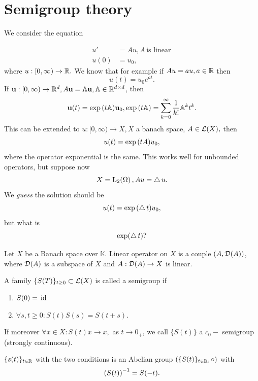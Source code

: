 \documentclass{article}
\begin{document}
\section{Semigroup theory}
\label{sec:semigroups}
We consider the equation

\begin{align*}
	u' &= Au, A \, \text{is linear} \,\\
	u(0) &= u_0,
\end{align*}
where $u:[0, \infty) \to {\mathbb R}.$ We know that for example if $Au = au, a \in {\mathbb R}$ then
\[
	u(t) = u_0 e^{at}.
\]
If $\vb{u}: [0,\infty) \to {\mathbb R}^{d}, A\vb{u} = \mathbb{A}\vb{u}, \mathbb{A} \in {\mathbb R}^{d \times d}$, then
\[
	\vb{u}(t) = \exp\qty(t\mathbb{A})\vb{u}_0, \exp\qty(t \mathbb{A}) = \sum_{k=0}^{\infty}\frac{1}{k!}\mathbb{A}^k t^k.
\]
This can be extended to $u:[0, \infty) \to X, X$ a banach space, $A \in \mathcal{L}\qty(X), $ then
\[
	u(t) = \exp\qty(tA)u_0,
\]
where the operator exponential is the same. This works well for unbounded operators, but suppose now
\[
	X = \LpSet[2]{\Omega}, Au = \laplace u.
\]
We \textit{guess} the solution should be
\[
	u(t) = \exp\qty(\operatorname{\bigtriangleup} t)u_0,
\]
but what is
\[
	\exp(\operatorname{\bigtriangleup} t)?
\]
\begin{definition}					Let $X$ be a Banach space over $\mathbb{K}$. Linear operator on $X$ is a couple $(A, \mathcal{D}\qty(A))$, where $\mathcal{D}\qty(A)$ is a subspace of $X$ and $A: \mathcal{D}\qty(A) \to X$ is linear.
\end{definition}

\begin{definition}
	A family $\{S(T)\}_{t \geq 0} \subset \mathcal{L}\qty(X)$ is called a semigroup if
	\begin{enumerate}
		\item $S\qty(0) = \, \text{id} \,$
		\item $\forall s,t \geq 0: S(t) S(s) = S(t+s).$
	\end{enumerate}
	If moreover $\forall x \in X: S(t)x \to x,$ as $t\to 0_+$, we call $\{S(t)\}$ a $c_0-$ semigroup (strongly continuous).
\end{definition}
\begin{remark}
	$\{s(t)\}_{t\in {\mathbb R}}$ with the two conditions is an Abelian group $\qty(\{S(t)\}_{t\in {\mathbb R}}, \circ)$ with
	\begin{equation}
		\qty(S(t))^{-1} = S\qty(-t).
	\end{equation}
\end{remark}
\end{document}

